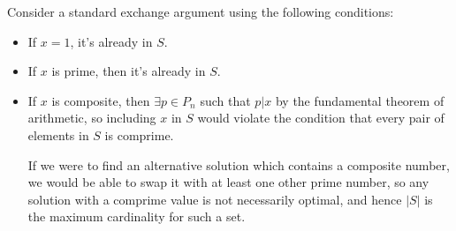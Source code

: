 \documentclass{article}
\begin{document}
\begin{solution}
    \item Consider a standard exchange argument using the following conditions:
\begin{itemize}
	\item If $x = 1$, it's already in $S$.
	\item If $x$ is prime, then it's already in $S$.
	\item If $x$ is composite, then $\exists p \in P_n$ such that $p | x$ by the fundamental theorem of arithmetic, so including $x$ in $S$ would violate the condition that every pair of elements in $S$ is comprime.

If we were to find an alternative solution which contains a composite number, we would be able to swap it with at least one other prime number, so any solution with a comprime value is not necessarily optimal, and hence $|S|$ is the maximum cardinality for such a set.
\end{itemize}
\end{solution}
\end{document}
